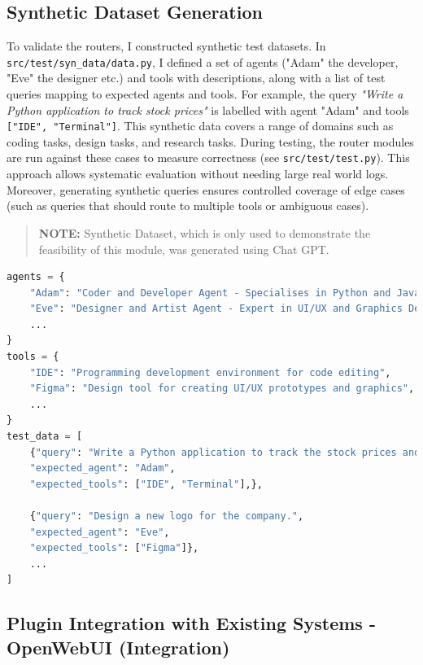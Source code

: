 \subsection{Synthetic Dataset Generation}
\label{synthetic dataset generation}
To validate the routers, I constructed synthetic test datasets. In \texttt{src/test/syn\_data/data.py}, I defined a set of agents ("Adam" the developer, "Eve" the designer etc.) and tools with descriptions, along with a list of test queries mapping to expected agents and tools. For example, the query \textit{"Write a Python application to track stock prices"} is labelled with agent "Adam" and tools \texttt{["IDE", "Terminal"]}. This synthetic data covers a range of domains such as coding tasks, design tasks, and research tasks. During testing, the router modules are run against these cases to measure correctness (see \texttt{src/test/test.py}). This approach allows systematic evaluation without needing large real world logs. Moreover, generating synthetic queries ensures controlled coverage of edge cases (such as queries that should route to multiple tools or ambiguous cases).

\begin{quote}
\textbf{NOTE:} Synthetic Dataset, which is only used to demonstrate the feasibility of this module, was generated using Chat GPT.
\end{quote}

\begin{lstlisting}[language=Python, caption={Example of the synthetic dataset}, breaklines=true]
agents = {
    "Adam": "Coder and Developer Agent - Specialises in Python and JavaScript development; creates scripts and applications.",
    "Eve": "Designer and Artist Agent - Expert in UI/UX and Graphics Design; produces content.",
    ...
}
tools = {
    "IDE": "Programming development environment for code editing",
    "Figma": "Design tool for creating UI/UX prototypes and graphics",
    ...
}
test_data = [
    {"query": "Write a Python application to track the stock prices and generate a report.",
    "expected_agent": "Adam",
    "expected_tools": ["IDE", "Terminal"],},

    {"query": "Design a new logo for the company.",
    "expected_agent": "Eve",
    "expected_tools": ["Figma"]},
    ...
]

\end{lstlisting}

\subsection{Plugin Integration with Existing Systems - OpenWebUI (Integration)}

